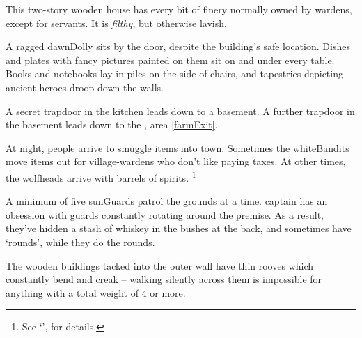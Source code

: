 \begin{multicols}{2}

This two-story wooden house has every bit of finery normally owned by \glspl{warden}, except for servants.
It is \emph{filthy}, but otherwise lavish.

\begin{boxtext}
  A ragged \gls{dawnDolly} sits by the door, despite the building's safe location.
  Dishes and plates with fancy pictures painted on them sit on and under every table.
  Books and notebooks lay in piles on the side of chairs, and tapestries depicting ancient heroes droop down the walls.
\end{boxtext}

A secret trapdoor in the kitchen leads down to a basement.
A further trapdoor in the basement leads down to the , area \vref{farmExit}.

At night, people arrive to smuggle items into \gls{town}.
Sometimes the \gls{whiteBandits} move items out for \gls{village}-\glspl{warden} who don't like paying taxes.
At other times, the \glspl{wolfhead} arrive with barrels of spirits.%
\footnote{See `',  for details.}



A minimum of five \glspl{sunGuard} patrol the grounds at a time.
\Gls{captain} has an obsession with guards constantly rotating around the premise.
As a result, they've hidden a stash of whiskey in the bushes at the back, and sometimes have `rounds', while they do the rounds.

The wooden buildings tacked into the outer wall have thin rooves which constantly bend and creak -- walking silently across them is impossible for anything with a total \gls{weight} of 4 or more.


\end{multicols}
